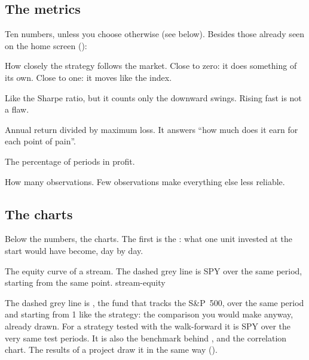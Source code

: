 \subsection{The metrics}

Ten numbers, unless you choose otherwise (see below). Besides those already
seen on the home screen ():

\begin{description}[leftmargin = 1.4em, style = nextline, itemsep = 4pt]
  \item[\voce{Beta vs SPY}] How closely the strategy follows the market.
    Close to zero: it does something of its own. Close to one: it moves like
    the index.
  \item[\voce{Sortino}] Like the Sharpe ratio, but it counts only the
    downward swings. Rising fast is not a flaw.
  \item[\voce{Calmar}] Annual return divided by maximum loss. It answers
    \enquote{how much does it earn for each point of pain}.
  \item[\voce{Hit rate}] The percentage of periods in profit.
  \item[\voce{N obs}] How many observations. Few observations make
    everything else less reliable.
\end{description}

\subsection{The charts}\label{sez:stream-charts}

Below the numbers, the charts. The first is the : what
one unit invested at the start would have become, day by day.

  {The equity curve of a stream. The dashed grey line is SPY over the same
   period, starting from the same point.}
  {stream-equity}

\noindent
The dashed grey line is , the fund that tracks the S\&P~500, over
the same period and starting from 1 like the strategy: the comparison you
would make anyway, already drawn. For a strategy tested with the
walk-forward it is SPY over the very same test periods. It is also the
benchmark behind ,  and the
correlation chart. The results of a project draw it in the same way
().

